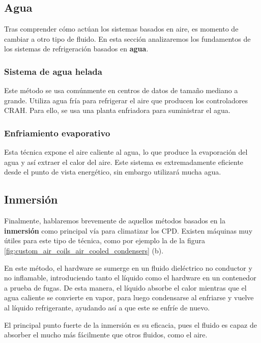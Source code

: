 \subsection{Agua} \label{awa}

Tras comprender cómo actúan los sistemas basados en aire, es momento de cambiar a otro tipo de fluido. En esta sección analizaremos los fundamentos de los sistemas de refrigeración basados en \textbf{agua}.


\subsubsection{Sistema de agua helada}

Este método se usa comúnmente en centros de datos de tamaño mediano a grande. Utiliza agua fría para refrigerar el aire que producen los controladores CRAH. Para ello, se usa una planta enfriadora para suministrar el agua.


\subsubsection{Enfriamiento evaporativo}

Esta técnica expone el aire caliente al agua, lo que produce la evaporación del agua y así extraer el calor del aire. Este sistema es extremadamente eficiente desde el punto de vista energético, sin embargo utilizará mucha agua.



\subsection{Inmersión} \label{inmersion}

Finalmente, hablaremos brevemente de aquellos métodos basados en la \textbf{inmersión} como principal vía para climatizar los CPD. Existen máquinas muy útiles para este tipo de técnica, como por ejemplo la de la figura \eqref{fig:custom_air_coils_air_cooled_condensers} (b).

En este método, el hardware se sumerge en un fluido dieléctrico no conductor y no inflamable, introduciendo tanto el líquido como el hardware en un contenedor a prueba de fugas. De esta manera, el líquido absorbe el calor mientras que el agua caliente se convierte en vapor, para luego condensarse al enfriarse y vuelve al líquido refrigerante, ayudando así a que este se enfríe de nuevo.

El principal punto fuerte de la inmersión es su eficacia, pues el fluido es capaz de absorber el mucho más fácilmente que otros fluidos, como el aire.



